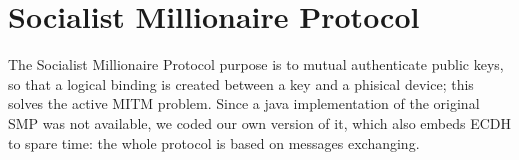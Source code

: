 \section{Socialist Millionaire Protocol}
The Socialist Millionaire Protocol purpose is to mutual authenticate public keys, so that a logical binding is created between a key and a phisical device; this solves the active MITM problem. Since a java implementation of the original SMP was not available, we coded our own version of it, which also embeds ECDH to spare time: the whole protocol is based on messages exchanging.